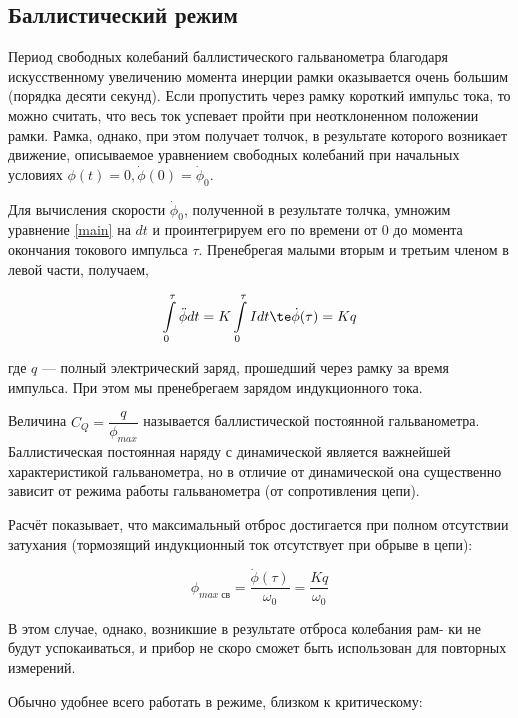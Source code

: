 \documentclass[12pt]{kiarticle} %
\begin{document}
	\subsection{Баллистический режим}
	
	Период свободных колебаний баллистического гальванометра благодаря искусственному увеличению момента инерции рамки оказывается очень большим (порядка десяти секунд). Если пропустить через рамку короткий импульс тока, то можно считать, что весь ток успевает пройти при неотклоненном положении рамки. Рамка, однако, при этом получает толчок, в результате которого возникает движение, описываемое уравнением свободных колебаний при начальных условиях $ \phi(t) = 0, \dot{\phi }(0) = \dot{\phi }_0 $.

	Для вычисления скорости $ \dot{\phi }_0 $, полученной в результате толчка, умножим уравнение \eqref{main} на $ dt $ и проинтегрируем его по времени от 0 до момента окончания токового импульса $ \tau $. Пренебрегая малыми вторым и третьим членом в левой части, получаем,
	
	\begin{equation}\label{q}
	\int\limits_0^\tau \ddot{\phi}dt = K 	\int\limits_0^\tau I dt \te \dot{\phi }(\tau) = Kq
	\end{equation}
	
	где $ q $ --- полный электрический заряд, прошедший через рамку за время импульса. При этом мы пренебрегаем зарядом индукционного тока.
	
	
	Величина $ C_Q = \dfrac{q}{\phi_{max}}$ называется баллистической постоянной гальванометра. Баллистическая постоянная наряду с динамической является важнейшей характеристикой гальванометра, но в отличие от динамической она существенно зависит от режима работы гальванометра (от сопротивления цепи).
	
	Расчёт показывает, что максимальный отброс достигается при полном
	отсутствии затухания (тормозящий индукционный ток отсутствует при
	обрыве в цепи):
	
	\begin{equation}\label{}
	\phi_{max \; св} = \dfrac{\dot{\phi }(\tau) }{\omega_0} = \dfrac{Kq}{\omega_0}
	\end{equation}
	
	В этом случае, однако, возникшие в результате отброса колебания рам-
	ки не будут успокаиваться, и прибор не скоро сможет быть использован
	для повторных измерений.
	
	Обычно удобнее всего работать в режиме, близком к критическому:
	
\end{document}
